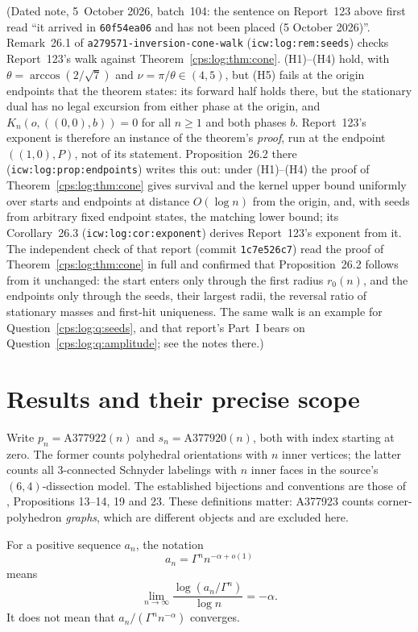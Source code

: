 \documentclass[11pt,letterpaper]{article}
\numberwithin{equation}{section}
\theoremstyle{remark}\newtheorem{remark}[theorem]{Remark}
\newcommand{\repo}[1]{\nolinkurl{#1}}
\begin{document}
\noindent(Dated note, 5~October 2026, batch~104: the sentence on Report~123 above first read ``it
arrived in \texttt{60f54ea06} and has not been placed (5 October 2026)''. Remark~26.1 of
\repo{a279571-inversion-cone-walk} (\texttt{icw:log:rem:seeds}) checks Report~123's walk against
Theorem~\ref{cps:log:thm:cone}. (H1)--(H4) hold, with $\theta=\arccos(2/\sqrt7)$ and
$\nu=\pi/\theta\in(4,5)$, but (H5) fails at the origin endpoints that the theorem states: its forward
half holds there, but the stationary dual has no legal excursion from either phase at the origin, and
$K_n(o,((0,0),b))=0$ for all $n\ge1$ and both phases $b$. Report~123's exponent is therefore an
instance of the theorem's \emph{proof}, run at the endpoint $((1,0),P)$, not of its statement.
Proposition~26.2 there (\texttt{icw:log:prop:endpoints}) writes this out: under (H1)--(H4) the proof of
Theorem~\ref{cps:log:thm:cone} gives survival and the kernel upper bound uniformly over starts and
endpoints at distance $O(\log n)$ from the origin, and, with seeds from arbitrary fixed endpoint
states, the matching lower bound; its Corollary~26.3 (\texttt{icw:log:cor:exponent}) derives
Report~123's exponent from it. The independent check of that report (commit \texttt{1c7e526c7}) read
the proof of Theorem~\ref{cps:log:thm:cone} in full and confirmed that Proposition~26.2 follows from it
unchanged: the start enters only through the first radius $r_0(n)$, and the endpoints only through the
seeds, their largest radii, the reversal ratio of stationary masses and first-hit uniqueness. The same
walk is an example for Question~\ref{cps:log:q:seeds}, and that report's Part~I bears on
Question~\ref{cps:log:q:amplitude}; see the notes there.)

\section{Results and their precise scope}
Write $p_n=\mathrm{A377922}(n)$ and $s_n=\mathrm{A377920}(n)$, both with
index starting at zero. The former counts polyhedral orientations with $n$
inner vertices; the latter counts all 3-connected Schnyder labelings with
$n$ inner faces in the source's $(6,4)$-dissection model. The established
bijections and conventions are those of \cite{FNS}, Propositions 13--14,
19 and 23. These definitions matter: A377923 counts corner-polyhedron
\emph{graphs}, which are different objects and are excluded here.

For a positive sequence $a_n$, the notation
\[
 a_n=\Gamma^n n^{-\alpha+o(1)}
\]
means
\[
 \lim_{n\to\infty}\frac{\log(a_n/\Gamma^n)}{\log n}=-\alpha.
\]
It does not mean that $a_n/(\Gamma^n n^{-\alpha})$ converges.
\end{document}
